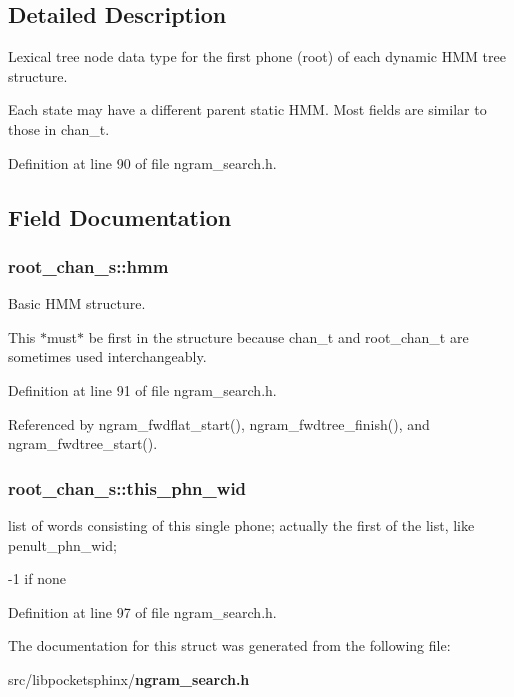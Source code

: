 \subsection{\-Detailed \-Description}
\-Lexical tree node data type for the first phone (root) of each dynamic \-H\-M\-M tree structure. 

\-Each state may have a different parent static \-H\-M\-M. \-Most fields are similar to those in chan\-\_\-t. 

\-Definition at line 90 of file ngram\-\_\-search.\-h.



\subsection{\-Field \-Documentation}
\subsubsection[{hmm}]{ {\bf root\-\_\-chan\-\_\-s\-::hmm}}\label{structroot__chan__s_a9d4d92ffa8b4079202ddebe3ba0eb290}


\-Basic \-H\-M\-M structure. 

\-This $\ast$must$\ast$ be first in the structure because chan\-\_\-t and root\-\_\-chan\-\_\-t are sometimes used interchangeably. 

\-Definition at line 91 of file ngram\-\_\-search.\-h.



\-Referenced by ngram\-\_\-fwdflat\-\_\-start(), ngram\-\_\-fwdtree\-\_\-finish(), and ngram\-\_\-fwdtree\-\_\-start().

\subsubsection[{this\-\_\-phn\-\_\-wid}]{ {\bf root\-\_\-chan\-\_\-s\-::this\-\_\-phn\-\_\-wid}}\label{structroot__chan__s_af5bb41f0c9a03211ab90919f65be1564}


list of words consisting of this single phone; actually the first of the list, like penult\-\_\-phn\-\_\-wid; 

-\/1 if none 

\-Definition at line 97 of file ngram\-\_\-search.\-h.



\-The documentation for this struct was generated from the following file\-:\begin{DoxyCompactItemize}
\item 
src/libpocketsphinx/{\bf ngram\-\_\-search.\-h}\end{DoxyCompactItemize}
